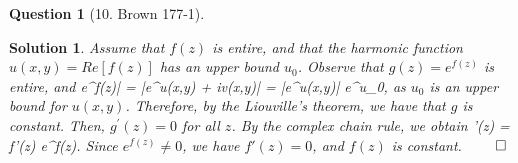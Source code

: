 \documentclass{article} %
\def\eQb#1\eQe{\begin{eqnarray*}#1\end{eqnarray*}}
\theoremstyle{quest}
\newtheorem*{question}{Question}
\newtheorem*{solution}{Solution}
\begin{document}
\bigskip

\begin{question}[10. Brown 177-1]
\end{question}
\begin{solution}
Assume that $f(z)$ is entire, and that the harmonic function $u(x,y) = Re[f(z)]$
has an upper bound $u_0$. Observe that $g(z) = e^{f(z)}$ is entire, and 
\eQb
|e^{f(z)}| = |e^{u(x,y) + iv(x,y)}| = |e^{u(x,y)}| \leq e^{u_0},
\eQe
as $u_0$ is an upper bound for $u(x,y)$. Therefore, by the Liouville's theorem, we have
that $g$ is constant. Then, $g^{'}(z) = 0$ for all $z$. By the complex chain rule, we obtain
\eQb
g'(z) = f'(z) e^{f(z)}. 
\eQe
Since $e^{f(z)} \neq 0$, we have $f'(z) = 0$, and $f(z)$ is constant. $\qed$

\end{solution}
\end{document}
